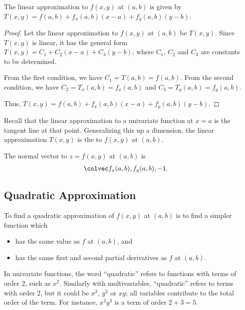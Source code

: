 \begin{proposition}
    The linear approximation to $f(x, y)$ at $(a, b)$ is given by $T(x, y) = f(a, b) + f_x(a,b) (x-a) + f_y(a, b) (y-b)$.
\end{proposition}
\begin{proof}
    Let the linear approximation to $f(x, y)$ at $(a, b)$ be $T(x, y)$. Since $T(x, y)$ is linear, it has the general form $T(x, y) = C_1 + C_2 (x-a) + C_3 (y-b)$, where $C_1$, $C_2$ and $C_3$ are constants to be determined.

    From the first condition, we have $C_1 = T(a,b) = f(a, b)$. From the second condition, we have $C_2 = T_x(a,b) = f_x(a, b)$ and $C_3 = T_y(a,b) = f_y(a, b)$.

    Thus, $T(x, y) = f(a, b) + f_x(a,b) (x-a) + f_y(a, b) (y-b)$.
\end{proof}

Recall that the linear approximation to a univariate function at $x = a$ is the tangent line at that point. Generalizing this up a dimension, the linear approximation $T(x, y)$ is the  to $f(x, y)$ at $(a, b)$. 

\begin{corollary}
    The normal vector to $z = f(x, y)$ at $(a, b)$ is \[\cveciii{f_x(a,b)}{f_y(a,b)}{-1}.\]
\end{corollary}

\subsection{Quadratic Approximation}

To find a quadratic approximation of $f(x, y)$ at $(a, b)$ is to find a simpler function which
\begin{itemize}
    \item has the same value as $f$ at $(a, b)$, and
    \item has the same first and second partial derivatives as $f$ at $(a, b)$.
\end{itemize}

\begin{remark}
    In univariate functions, the word ``quadratic'' refers to functions with terms of order 2, such as $x^2$. Similarly with multivariables, ``quadratic'' refers to terms with order 2, but it could be $x^2$, $y^2$ or $xy$; all variables contribute to the total order of the term. For instance, $x^2 y^3$ is a term of order $2 + 3 = 5$.
\end{remark}

